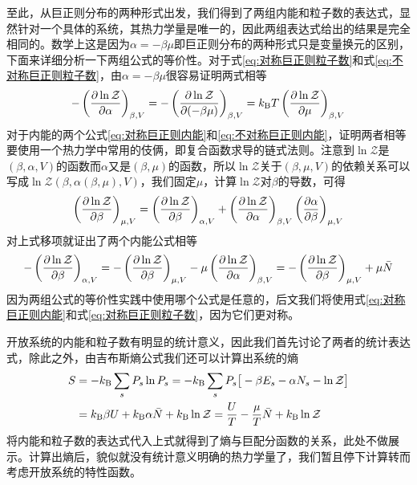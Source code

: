\documentclass[../../main.tex]{subfiles}
\begin{document}
至此，从巨正则分布的两种形式出发，我们得到了两组内能和粒子数的表达式，显然针对一个具体的系统，其热力学量是唯一的，因此两组表达式给出的结果是完全相同的。数学上这是因为\(\alpha=-\beta\mu\)即巨正则分布的两种形式只是变量换元的区别，下面来详细分析一下两组公式的等价性。对于式\eqref{eq:对称巨正则粒子数}和式\eqref{eq:不对称巨正则粒子数}，由\(\alpha=-\beta\mu\)很容易证明两式相等
\begin{equation}
    -\left(\pdv{\ln\mathcal{Z}}{\alpha}\right)_{\beta,V}=-\left(\pdv{\ln\mathcal{Z}}{(-\beta\mu)}\right)_{\beta,V}=k_{\mathrm{B}} T\left(\pdv{\ln\mathcal{Z}}{\mu}\right)_{\beta,V}
\end{equation}
对于内能的两个公式\eqref{eq:对称巨正则内能}和\eqref{eq:不对称巨正则内能}，证明两者相等要使用一个热力学中常用的伎俩，即复合函数求导的链式法则。注意到\(\ln\mathcal{Z}\)是\((\beta,\alpha,V)\)的函数而\(\alpha\)又是\((\beta,\mu)\)的函数，所以\(\ln\mathcal{Z}\)关于\((\beta,\mu,V)\)的依赖关系可以写成\(\ln\mathcal{Z}(\beta,\alpha(\beta,\mu),V)\)，我们固定\(\mu\)，计算\(\ln\mathcal{Z}\)对\(\beta\)的导数，可得
\begin{equation}
    \left(\pdv{\ln \mathcal{Z}}{\beta}\right)_{\mu,V}=\left(\pdv{\ln \mathcal{Z}}{\beta}\right)_{\alpha,V}+\left(\pdv{\ln \mathcal{Z}}{\alpha}\right)_{\beta,V}\left(\pdv{\alpha}{\beta}\right)_{\mu,V}
\end{equation}
对上式移项就证出了两个内能公式相等
\begin{equation}
    -\left(\pdv{\ln \mathcal{Z}}{\beta}\right)_{\alpha,V}=-\left(\pdv{\ln \mathcal{Z}}{\beta}\right)_{\mu,V}-\mu\left(\pdv{\ln \mathcal{Z}}{\alpha}\right)_{\beta,V}=-\left(\pdv{\ln \mathcal{Z}}{\beta}\right)_{\mu,V}+\mu\bar{N}
\end{equation}
因为两组公式的等价性实践中使用哪个公式是任意的，后文我们将使用式\eqref{eq:对称巨正则内能}和式\eqref{eq:对称巨正则粒子数}，因为它们更对称。

开放系统的内能和粒子数有明显的统计意义，因此我们首先讨论了两者的统计表达式，除此之外，由吉布斯熵公式我们还可以计算出系统的熵
\begin{equation}
    \begin{split}
        S&=-k_{\mathrm{B}}\sum_sP_s\ln P_s=-k_{\mathrm{B}}\sum_sP_s\big[-\beta E_s-\alpha N_s-\ln\mathcal{Z}\big] \\
        &=k_{\mathrm{B}}\beta U+k_{\mathrm{B}}\alpha \bar{N}+k_{\mathrm{B}}\ln\mathcal{Z}=\frac{U}{T}-\frac{\mu}{T}\bar{N}+k_{\mathrm{B}}\ln\mathcal{Z}
    \end{split}
\end{equation}
将内能和粒子数的表达式代入上式就得到了熵与巨配分函数的关系，此处不做展示。计算出熵后，貌似就没有统计意义明确的热力学量了，我们暂且停下计算转而考虑开放系统的特性函数。
\end{document}
